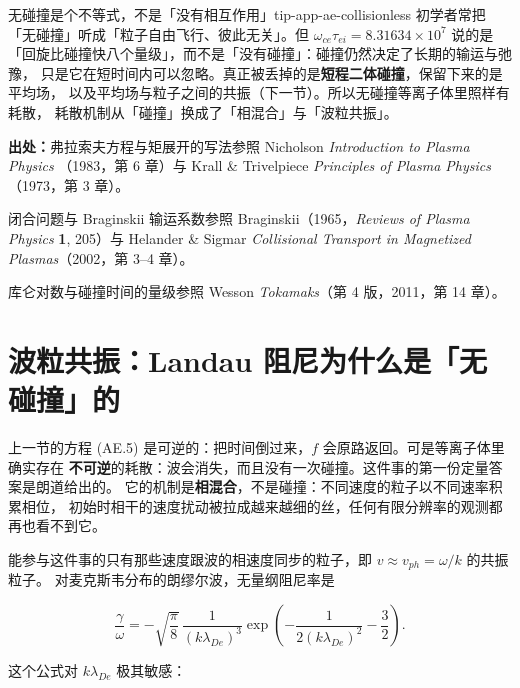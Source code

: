 \begin{tip}{无碰撞是个不等式，不是「没有相互作用」}{tip-app-ae-collisionless}
初学者常把「无碰撞」听成「粒子自由飞行、彼此无关」。但 $\omega_{ce}\tau_{ei}=8.31634\times10^{7}$
说的是「回旋比碰撞快八个量级」，而不是「没有碰撞」：碰撞仍然决定了长期的输运与弛豫，
只是它在短时间内可以忽略。真正被丢掉的是\textbf{短程二体碰撞}，保留下来的是平均场，
以及平均场与粒子之间的共振（下一节）。所以无碰撞等离子体里照样有耗散，
耗散机制从「碰撞」换成了「相混合」与「波粒共振」。
\end{tip}

{\footnotesize
\textbf{出处：}弗拉索夫方程与矩展开的写法参照 Nicholson \emph{Introduction to Plasma Physics}
（1983，第 6 章）与 Krall \& Trivelpiece \emph{Principles of Plasma Physics}（1973，第 3 章）。

闭合问题与 Braginskii 输运系数参照 Braginskii（1965，\emph{Reviews of Plasma Physics} \textbf{1}, 205）与 Helander \& Sigmar \emph{Collisional Transport in Magnetized Plasmas}（2002，第 3--4 章）。

库仑对数与碰撞时间的量级参照 Wesson \emph{Tokamaks}（第 4 版，2011，第 14 章）。
\section{波粒共振：Landau 阻尼为什么是「无碰撞」的}
\label{sec:app-ae-landau}
}

上一节的方程 (AE.5) 是可逆的：把时间倒过来，$f$ 会原路返回。可是等离子体里确实存在
\textbf{不可逆}的耗散：波会消失，而且没有一次碰撞。这件事的第一份定量答案是朗道给出的。
它的机制是\textbf{相混合}，不是碰撞：不同速度的粒子以不同速率积累相位，
初始时相干的速度扰动被拉成越来越细的丝，任何有限分辨率的观测都再也看不到它。

能参与这件事的只有那些速度跟波的相速度同步的粒子，即 $v\approx v_{ph}=\omega/k$ 的共振粒子。
对麦克斯韦分布的朗缪尔波，无量纲阻尼率是

\begin{equation}
\frac{\gamma}{\omega}=-\sqrt{\frac{\pi}{8}}\,
\frac{1}{\left(k\lambda_{De}\right)^{3}}
\exp\!\left(-\frac{1}{2\left(k\lambda_{De}\right)^{2}}-\frac{3}{2}\right).
\label{eq:app-ae-landau}
\end{equation}

这个公式对 $k\lambda_{De}$ 极其敏感：

